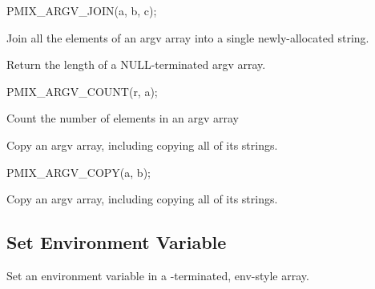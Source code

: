 \cspecificstart
\begin{codepar}
PMIX_ARGV_JOIN(a, b, c);
\end{codepar}
\cspecificend

\begin{arglist}
\end{arglist}

Join all the elements of an argv array into a single newly-allocated string.


Return the length of a NULL-terminated argv array.

\cspecificstart
\begin{codepar}
PMIX_ARGV_COUNT(r, a);
\end{codepar}
\cspecificend

\begin{arglist}
\end{arglist}

Count the number of elements in an argv array


Copy an argv array, including copying all of its strings.

\cspecificstart
\begin{codepar}
PMIX_ARGV_COPY(a, b);
\end{codepar}
\cspecificend

\begin{arglist}
\end{arglist}

Copy an argv array, including copying all of its strings.


\subsection{Set Environment Variable}

\summary

Set an environment variable in a -terminated, env-style array.


